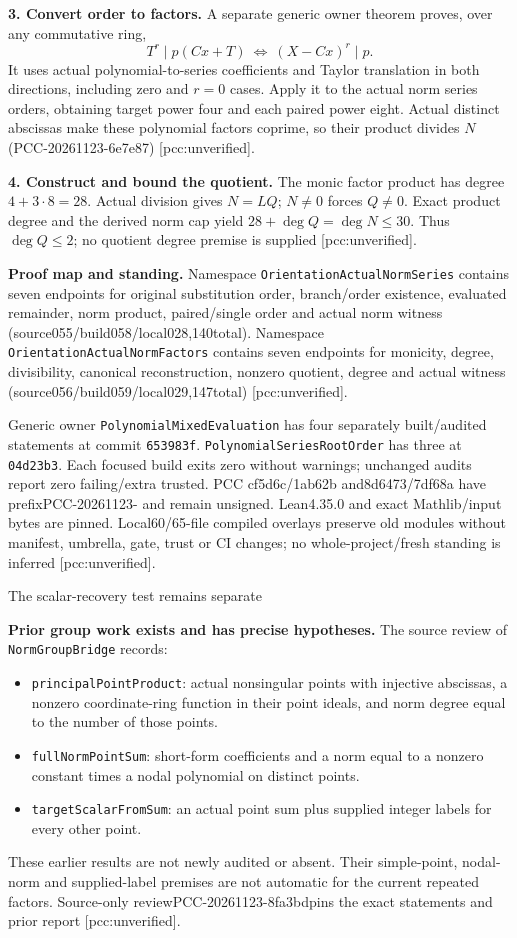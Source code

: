 \documentclass[10pt]{article}
\begin{document}
\textbf{3. Convert order to factors.}
A separate generic owner theorem proves, over any commutative ring,
\[
 T^r\mid p(Cx+T)\ \Longleftrightarrow\ (X-Cx)^r\mid p.
\]
It uses actual polynomial-to-series coefficients and Taylor translation
in both directions, including zero and $r=0$ cases.
Apply it to the actual norm series orders, obtaining target power four
and each paired power eight. Actual distinct abscissas make these
polynomial factors coprime, so their product divides $N$
(PCC-20261123-6e7e87) [pcc:unverified].

\textbf{4. Construct and bound the quotient.}
The monic factor product has degree $4+3\cdot8=28$.
Actual division gives $N=LQ$; $N\ne0$ forces $Q\ne0$.
Exact product degree and the derived norm cap yield
$28+\deg Q=\deg N\le30$. Thus $\deg Q\le2$; no quotient degree premise
is supplied [pcc:unverified].

\textbf{Proof map and standing.}
Namespace \texttt{OrientationActualNormSeries} contains seven endpoints
for original substitution order, branch/order existence, evaluated
remainder, norm product, paired/single order and actual norm witness
(source055/build058/local028,140total).
Namespace \texttt{OrientationActualNormFactors} contains seven endpoints
for monicity, degree, divisibility, canonical reconstruction, nonzero
quotient, degree and actual witness
(source056/build059/local029,147total) [pcc:unverified].

Generic owner \texttt{PolynomialMixedEvaluation} has four separately
built/audited statements at commit \texttt{653983f}.
\texttt{PolynomialSeriesRootOrder} has three at
\texttt{04d23b3}. Each focused build exits zero without warnings;
unchanged audits report zero failing/extra trusted.
PCC cf5d6c/1ab62b and8d6473/7df68a have prefixPCC-20261123- and remain
unsigned. Lean4.35.0 and exact Mathlib/input bytes are pinned.
Local60/65-file compiled overlays preserve old modules without manifest,
umbrella, gate, trust or CI changes; no whole-project/fresh standing
is inferred [pcc:unverified].
\newpage
\begin{center}{\Large The scalar-recovery test remains separate}\end{center}
\textbf{Prior group work exists and has precise hypotheses.}
The source review of \texttt{NormGroupBridge} records:
\begin{itemize}
\item \texttt{principalPointProduct}: actual nonsingular points with
injective abscissas, a nonzero coordinate-ring function in their
point ideals, and norm degree equal to the number of those points.
\item \texttt{fullNormPointSum}: short-form coefficients and a norm
equal to a nonzero constant times a nodal polynomial on distinct points.
\item \texttt{targetScalarFromSum}: an actual point sum plus supplied
integer labels for every other point.
\end{itemize}
These earlier results are not newly audited or absent. Their simple-point,
nodal-norm and supplied-label premises are not automatic for the current
repeated factors. Source-only reviewPCC-20261123-8fa3bdpins the exact
statements and prior report [pcc:unverified].
\end{document}
